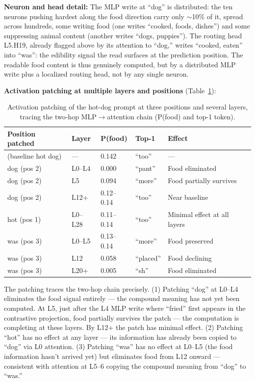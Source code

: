 \documentclass[11pt]{article}
\begin{document}
\textbf{Neuron and head detail:} The MLP write at ``dog'' is
distributed: the ten neurons pushing hardest along the food direction
carry only $\sim$10\% of it, spread across hundreds, some writing food
(one writes ``cooked, foods, dishes'') and some suppressing animal
content (another writes ``dogs, puppies''). The routing head L5.H19,
already flagged above by its attention to ``dog,'' writes ``cooked,
eaten'' into ``was'': the edibility signal the read surfaces at the
prediction position. The readable food content is thus genuinely
computed, but by a distributed MLP write plus a localized routing head,
not by any single neuron.

\textbf{Activation patching at multiple layers and positions} (Table~\ref{tab:hotdog-patch}):

\begin{table}[htbp]
\centering
\small
\begin{tabular}{lllll}
\toprule
Position patched & Layer & P(food) & Top-1 & Effect \\
\midrule
(baseline hot dog) & --- & 0.142 & ``too'' & --- \\
dog (pos 2) & L0--L4 & 0.000 & ``pant'' & Food eliminated \\
dog (pos 2) & L5 & 0.094 & ``more'' & Food partially survives \\
dog (pos 2) & L12+ & 0.12--0.14 & ``too'' & Near baseline \\
hot (pos 1) & L0--L28 & 0.11--0.14 & ``too'' & Minimal effect at all layers \\
was (pos 3) & L0--L5 & 0.13--0.14 & ``more'' & Food preserved \\
was (pos 3) & L12 & 0.058 & ``placed'' & Food declining \\
was (pos 3) & L20+ & 0.005 & ``sh'' & Food eliminated \\
\bottomrule
\end{tabular}
\caption{Activation patching of the hot-dog prompt at three positions and several layers, tracing the two-hop MLP$\rightarrow$attention chain (P(food) and top-1 token).}
\label{tab:hotdog-patch}
\end{table}

The patching traces the two-hop chain precisely. (1) Patching ``dog'' at L0--L4
eliminates the food signal entirely --- the compound meaning has not yet been
computed. At L5, just after the L4 MLP write where ``fried'' first
appears in the contrastive projection, food partially survives the
patch --- the computation is completing at these layers. By L12+ the patch has minimal effect. (2) Patching ``hot'' has no effect
at any layer --- its information has already been copied to ``dog'' via L0
attention. (3) Patching ``was'' has no effect at L0--L5 (the food information
hasn't arrived yet) but eliminates food from L12 onward --- consistent with
attention at L5--6 copying the compound meaning from ``dog'' to ``was.''
\end{document}
